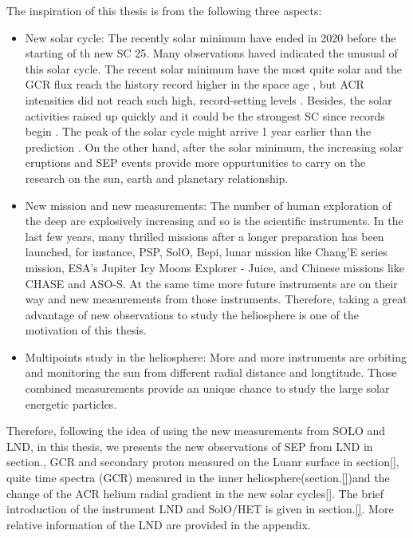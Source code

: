 The inspiration of this thesis is from the following three aspects:
\begin{itemize}
	\item New solar cycle: The recently solar minimum have ended in 2020 before the starting of th new \ac{SC} 25. Many observations haved indicated the unusual of this solar cycle. The recent solar minimum have the most quite solar and the \ac{GCR} flux reach the history record higher in the space age \citep{Fu2021ApJS, Xu2022FrASS}, but ACR intensities did not reach such high, record-setting levels \citet{Strauss2023ApJ}. Besides, the solar activities raised up quickly and it could be the strongest \ac{SC} since records begin \citet{Nagovitsyn2023SoPh}. The peak of the solar cycle might arrive 1 year earlier than the prediction \citet{McIntosh2020SoPh}. On the other hand, after the solar minimum, the increasing solar eruptions  and \ac{SEP} events provide more oppurtunities to carry on the research on the sun, earth and planetary relationship.
	\item New mission and new measurements: The number of human exploration of the deep are explosively increasing and so is the scientific instruments. In the last few years, many thrilled missions after a longer preparation has been launched, for instance, \ac{PSP}, \ac{SolO}, \ac{Bepi}, lunar mission like Chang'E series mission, ESA's Jupiter Icy Moons Explorer - Juice, and Chinese missions like CHASE and ASO-S. At the same time more future instruments are on their way and new measurements from those instruments. Therefore, taking a great advantage of new observations to study the heliosphere is one of the motivation of this thesis. 
	\item Multipoints study in the heliosphere: More and more instruments are orbiting and monitoring the sun from different radial distance and longtitude. Those combined measurements provide an unique chance to study the large solar energetic particles.
\end{itemize}

Therefore, following the idea of using the new measurements from SOLO and LND, in this thesis, we presents the new observations of \ac{SEP} from \ac{LND} in section.{}, \ac{GCR} and secondary proton measured on the Luanr surface in section\ref{}, quite time spectra (\ac{GCR}) measured in the inner heliosphere(section.\ref{})and the change of the \ac{ACR} helium radial gradient in the new solar cycles\ref{}.
The brief introduction of the instrument \ac{LND} and \ac{SolO}/\ac{HET} is given in section.\ref{}. 
More relative information of the \ac{LND} are provided in the appendix.

